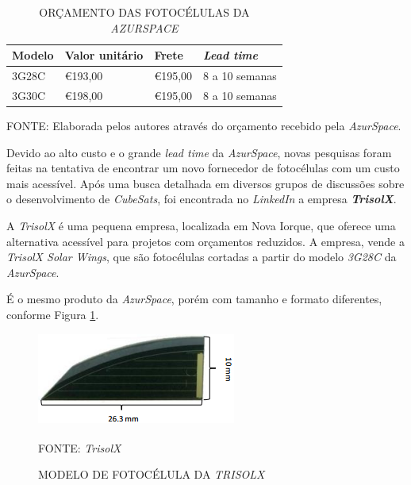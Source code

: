 \documentclass[
	12pt,				%
	openright,			%
	oneside,			%
	a4paper,			%
	english,			%
	french,				%
	spanish,			%
	brazil,				%
	oldfontcommands
	]{abntex2}
\begin{document}
	\begin{table}[th]
	\caption{ORÇAMENTO DAS FOTOCÉLULAS DA \textit{AZURSPACE}}
	\label{Tab_Orc_Cell}
	\centering
	\begin{tabular}{p{3.0cm}|p{3.0cm}|p{3.0cm}|p{3.0cm}}
		\textbf{Modelo} & \textbf{Valor unitário} & \textbf{Frete} & \textit{\textbf{Lead time}}\\
		\hline
		3G28C & \euro 193,00 & \euro 195,00 & 8 a 10 semanas\\
		3G30C & \euro 198,00 & \euro 195,00 & 8 a 10 semanas\\

	\end{tabular}
	
	\begin{small}
	\vspace{3pt}
		FONTE: Elaborada pelos autores através do orçamento recebido pela \textit{AzurSpace}.
	\end{small}
	\end{table}	
	
	Devido ao alto custo e o grande \textit{lead time} da \textit{AzurSpace}, novas pesquisas foram feitas na tentativa de encontrar um novo fornecedor de fotocélulas com um custo mais acessível. Após uma busca detalhada em diversos grupos de discussões sobre o desenvolvimento de \textit{CubeSats}, foi encontrada no \textit{LinkedIn} a empresa \textbf{\textit{TrisolX}}.
	
	A \textit{TrisolX} é uma pequena empresa, localizada em Nova Iorque, que oferece uma alternativa acessível para projetos com orçamentos reduzidos. A empresa, vende a \textit{TrisolX Solar Wings}, que são fotocélulas cortadas a partir do modelo \textit{3G28C} da \textit{AzurSpace}.
	
	É o mesmo produto da \textit{AzurSpace}, porém com tamanho e formato diferentes, conforme Figura \ref{Fig_Cell_TrisolX}.
	
	\begin{figure}[th]
		\caption{MODELO DE FOTOCÉLULA DA \textit{TRISOLX}}
		\label{Fig_Cell_TrisolX}
		\centering
		\includegraphics[width=0.5\linewidth]{./figs/TrisolX}
			
		\begin{small}
			FONTE: \textit{TrisolX}\textsuperscript{\cite{TrisolX}}
		\end{small}		
	\end{figure}	
\end{document}
